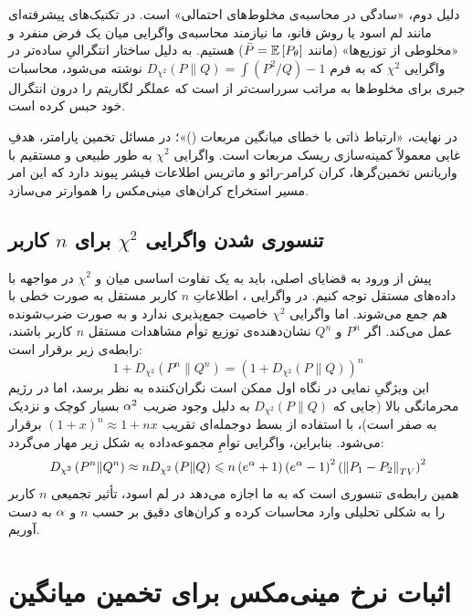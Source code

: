 دلیل دوم، «سادگی در محاسبه‌ی مخلوط‌های احتمالی» است. در تکنیک‌های پیشرفته‌ای مانند لم اسود یا روش فانو، ما نیازمند محاسبه‌ی واگرایی میان یک فرض منفرد و «مخلوطی از توزیع‌ها» (مانند $\bar{P} = \Eset\left[P_\theta\right]$) هستیم. به دلیل ساختار انتگرالیِ ساده‌تر در واگرایی $\chi^2$ که به فرم $D_{\chi^2}\left(P \| Q\right) = \int \left(P^2 / Q\right) - 1$ نوشته می‌شود، محاسبات جبری برای مخلوط‌ها به مراتب سرراست‌تر از  است که عملگر لگاریتم را درون انتگرال خود حبس کرده است.

در نهایت، «ارتباط ذاتی با خطای میانگین مربعات ()»؛ در مسائل تخمین پارامتر، هدفِ غایی معمولاً کمینه‌سازی ریسک مربعات است. واگرایی $\chi^2$ به طور طبیعی و مستقیم با واریانس تخمین‌گرها، کران کرامر-رائو و ماتریس اطلاعات فیشر پیوند دارد که این امر مسیر استخراج کران‌های مینی‌مکس را هموارتر می‌سازد.

\subsection{تنسوری شدن واگرایی $\chi^2$ برای $n$ کاربر}
پیش از ورود به قضایای اصلی، باید به یک تفاوت اساسی میان  و $\chi^2$ در مواجهه با داده‌های مستقل توجه کنیم. در واگرایی ، اطلاعاتِ $n$ کاربر مستقل به صورت خطی با هم جمع می‌شوند. اما واگرایی $\chi^2$ خاصیت جمع‌پذیری ندارد و به صورت ضرب‌شونده عمل می‌کند. اگر $P^n$ و $Q^n$ نشان‌دهنده‌ی توزیع توأم مشاهدات مستقل $n$ کاربر باشند، رابطه‌ی زیر برقرار است:
\begin{equation}
1 + D_{\chi^2}\left(P^n \| Q^n\right) = \left( 1 + D_{\chi^2}\left(P \| Q\right) \right)^n
\end{equation}
این ویژگیِ نمایی در نگاه اول ممکن است نگران‌کننده به نظر برسد، اما در رژیم محرمانگی بالا (جایی که $D_{\chi^2}\left(P \| Q\right)$ به دلیل وجود ضریب $\alpha^2$ بسیار کوچک و نزدیک به صفر است)، با استفاده از بسط دوجمله‌ای تقریب $(1+x)^n \approx 1 + nx$ برقرار می‌شود. بنابراین، واگرایی توأمِ مجموعه‌داده به شکل زیر مهار می‌گردد:
\begin{equation}
\label{eq:chi-tensorization-approx}
D_{\chi^2}\left(P^n \| Q^n\right) \approx n D_{\chi^2}\left(P \| Q\right) \leqslant n \left(e^{\alpha} + 1\right)\left(e^{\alpha} - 1\right)^2 \left(\left\lVert P_1 - P_2\right\rVert_{TV}\right)^2
\end{equation}
همین رابطه‌ی تنسوری است که به ما اجازه می‌دهد در لم اسود، تأثیر تجمیعی $n$ کاربر را به شکلی تحلیلی وارد محاسبات کرده و کران‌های دقیق بر حسب $n$ و $\alpha$ به دست آوریم.
\section{اثبات نرخ مینی‌مکس برای تخمین میانگین}
\label{sec:minimax:mean-estimation}

